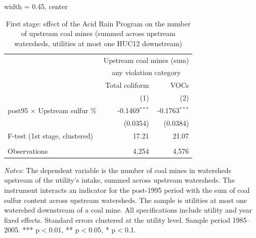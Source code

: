 
\begin{table}[htbp]
   
   \caption{\label{tab:fs_dwnstrm_nonminevio_ivsum} First stage: effect of the Acid Rain Program on the number of upstream coal mines (summed across upstream watersheds, utilities at most one HUC12 downstream)}
   \bigskip
   
   \centering
   
   \begin{adjustbox}{width = 0.45\textwidth, center}
      
      
      \begin{tabular}{lrr}
         \toprule
         
          & \multicolumn{2}{c}{Upstream coal mines (sum)}\\
         
          & \multicolumn{2}{c}{any violation category} \\ 
                                              & Total coliform  & VOCs \\   
         
                                              & (1)             & (2)\\  
         
         \midrule 
         post95 $\times$ Upstream sulfur \%   & -0.1469$^{***}$ & -0.1763$^{***}$\\   
                                              & (0.0354)        & (0.0384)\\   
         
         F-test (1st stage, clustered)        & 17.21           & 21.07\\  
         
          \\
         
         Observations                         & 4,254           & 4,576\\  
         
         \bottomrule
         
      \end{tabular}
      
      
      
   \end{adjustbox}
      {\tiny\linespread{1}\selectfont \par \raggedright 
   \textit{Notes:} The dependent variable is the number of coal mines in watersheds upstream of the utility's intake, summed across upstream watersheds. The instrument interacts an indicator for the post-1995 period with the sum of coal sulfur content across upstream watersheds. The sample is utilities at most one watershed downstream of a coal mine. All specifications include utility and year fixed effects. Standard errors clustered at the utility level. Sample period 1985--2005. *** p$<$0.01, ** p$<$0.05, * p$<$0.1.}
   
\end{table}


